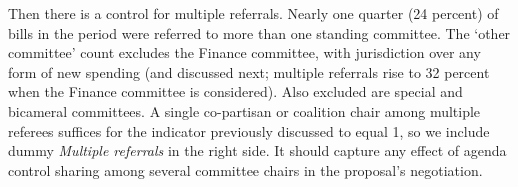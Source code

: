\documentclass[letter,12pt]{article}
\newcommand{\mc}{\multicolumn}
\begin{document}
\begin{table}
\end{table}

Then there is a control for multiple referrals. Nearly one quarter (24 percent) of bills in the period were referred to more than one standing committee. The `other committee' count excludes the Finance committee, with jurisdiction over any form of new spending (and discussed next; multiple referrals rise to 32 percent when the Finance committee is considered). Also excluded are special and bicameral committees. A single co-partisan or coalition chair among multiple referees suffices for the indicator previously discussed to equal 1, so we include dummy \emph{Multiple referrals} in the right side. It should capture any effect of agenda control sharing among several committee chairs in the proposal's negotiation. 
\end{document}
